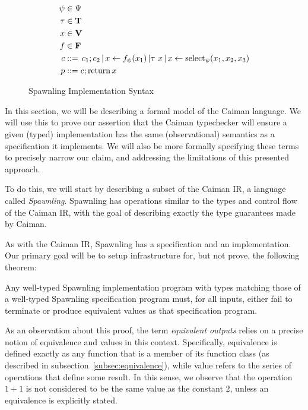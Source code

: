 \begin{figure}
\begin{align*}
	\psi&\in \Psi\\
   	\tau&\in \textbf{T} \\
	x&\in \textbf{V}\\
	f&\in \textbf{F}\\
	c&\mathrel{::=} \,c_1 ; c_2 \,|\, 
        x\leftarrow f_\psi(x_1) \,| \tau\ x \,|\, x\leftarrow\textrm{select}_{\psi} (x_1, x_2, x_3)\\
    p&\mathrel{::=} c;\textrm{return}\, x
\end{align*}
\caption{Spawnling Implementation Syntax}
\label{fig:spawnimplsyntax}
\end{figure}
In this section, we will be describing a formal model of the Caiman language. We will use this to prove our assertion that the Caiman typechecker will ensure a given (typed) implementation has the same (observational) semantics as a specification it implements.  We will also be more formally specifying these terms to precisely narrow our claim, and addressing the limitations of this presented approach.

To do this, we will start by describing a subset of the Caiman IR, a language called \textit{Spawnling}.  Spawnling has operations similar to the types and control flow of the Caiman IR, with the goal of describing exactly the type guarantees made by Caiman.

As with the Caiman IR, Spawnling has a specification and an implementation.  Our primary goal will be to setup infrastructure for, but not prove, the following theorem:
%
\begin{theorem}
Any well-typed Spawnling implementation program with types matching those of a well-typed Spawnling specification program must, for all inputs, either fail to terminate or produce equivalent values as that specification program.
\end{theorem}
%
As an observation about this proof, the term \textit{equivalent outputs} relies on a precise notion of equivalence and values in this context.  Specifically, equivalence is defined exactly as any function that is a member of its function class (as described in subsection~\ref{subsec:equivalence}), while value refers to the series of operations that define some result.  In this sense, we observe that the operation $1+1$ is not considered to be the same value as the constant $2$, unless an equivalence is explicitly stated.


